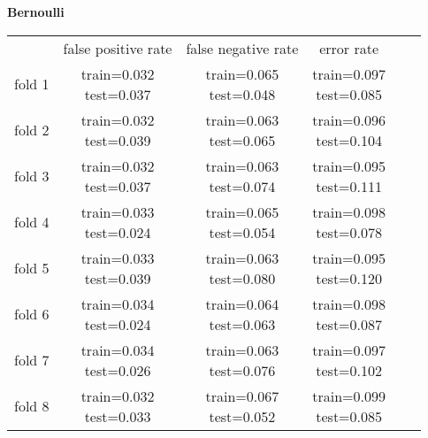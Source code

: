 \documentclass[12pt]{article}
\begin{document}
		\textbf{Bernoulli} \\
		\begin{tabular}{ r|c|c|c|c|c| } \multicolumn{1}{r}{}
& \multicolumn{1}{c}{false positive rate}
& \multicolumn{1}{c}{false negative rate}
& \multicolumn{1}{c}{error rate} \\
\cline{2-4}
fold 1 & \shortstack{train=0.032 \\ test=0.037}& \shortstack{train=0.065 \\ test=0.048}& \shortstack{train=0.097 \\ test=0.085} \\\cline{2-4}
fold 2 & \shortstack{train=0.032 \\ test=0.039}& \shortstack{train=0.063 \\ test=0.065}& \shortstack{train=0.096 \\ test=0.104} \\\cline{2-4}
fold 3 & \shortstack{train=0.032 \\ test=0.037}& \shortstack{train=0.063 \\ test=0.074}& \shortstack{train=0.095 \\ test=0.111} \\\cline{2-4}
fold 4 & \shortstack{train=0.033 \\ test=0.024}& \shortstack{train=0.065 \\ test=0.054}& \shortstack{train=0.098 \\ test=0.078} \\\cline{2-4}
fold 5 & \shortstack{train=0.033 \\ test=0.039}& \shortstack{train=0.063 \\ test=0.080}& \shortstack{train=0.095 \\ test=0.120} \\\cline{2-4}
fold 6 & \shortstack{train=0.034 \\ test=0.024}& \shortstack{train=0.064 \\ test=0.063}& \shortstack{train=0.098 \\ test=0.087} \\\cline{2-4}
fold 7 & \shortstack{train=0.034 \\ test=0.026}& \shortstack{train=0.063 \\ test=0.076}& \shortstack{train=0.097 \\ test=0.102} \\\cline{2-4}
fold 8 & \shortstack{train=0.032 \\ test=0.033}& \shortstack{train=0.067 \\ test=0.052}& \shortstack{train=0.099 \\ test=0.085} \\\cline{2-4}

\end{tabular}
\end{document}
